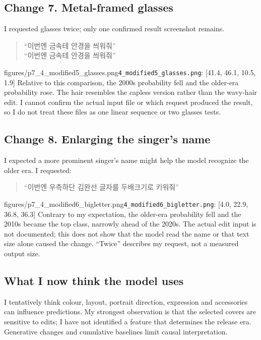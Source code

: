 \documentclass[11pt]{article}
\begin{document}
\subsection*{Change 7. Metal-framed glasses}
I requested glasses twice; only one confirmed result screenshot remains.
\begin{quote}
“이번엔 금속테 안경을 씌워줘”\\
“이번엔 금속테 안경을 씌워줘”
\end{quote}
{figures/p7_4_modified5_glasses.png}{\texttt{4\_modified5\_glasses.png}: [41.4, 46.1, 10.5, 1.9]}
Relative to this comparison, the 2000s probability fell and the older-era probability rose. The hair resembles the capless version rather than the wavy-hair edit. I cannot confirm the actual input file or which request produced the result, so I do not treat these files as one linear sequence or two glasses tests.

\subsection*{Change 8. Enlarging the singer's name}
I expected a more prominent singer's name might help the model recognize the older era. I requested:
\begin{quote}“이번엔 우측하단 김완선 글자를 두배크기로 키워줘”\end{quote}
{figures/p7_4_modified6_bigletter.png}{\texttt{4\_modified6\_bigletter.png}: [4.0, 22.9, 36.8, 36.3]}
Contrary to my expectation, the older-era probability fell and the 2010s became the top class, narrowly ahead of the 2020s. The actual edit input is not documented; this does not show that the model read the name or that text size alone caused the change. ``Twice'' describes my request, not a measured output size.

\subsection*{What I now think the model uses}
I tentatively think colour, layout, portrait direction, expression and accessories can influence predictions. My strongest observation is that the selected covers are sensitive to edits; I have not identified a feature that determines the release era. Generative changes and cumulative baselines limit causal interpretation.
\end{document}
